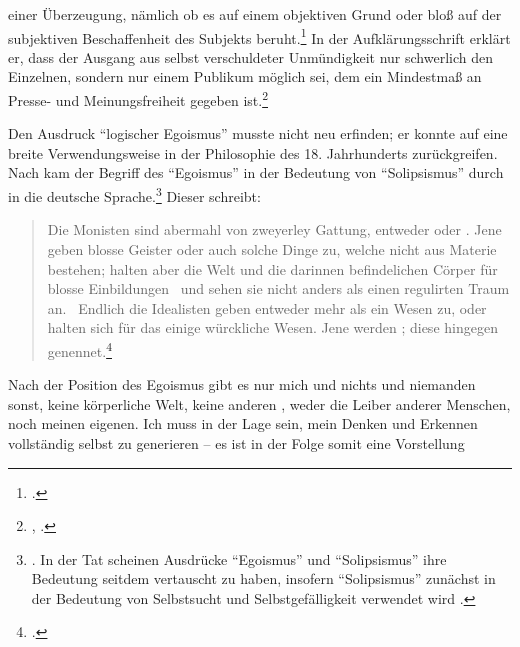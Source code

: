 einer Überzeugung, nämlich ob es auf einem objektiven Grund oder bloß auf der
subjektiven Beschaffenheit des Subjekts
beruht.\footnote{\cite[Vgl.][B 848\,f.,]{Kant:KritikderreinenVernunft2003}
\cite[][III: 532.3--16]{Kant:GesammelteWerke1900ff.}.} In der Aufklärungsschrift
erklärt er, dass der Ausgang aus selbst verschuldeter Unmündigkeit nur schwerlich den
Einzelnen, sondern nur einem Publikum möglich sei, dem ein Mindestmaß an Presse-
und Meinungsfreiheit gegeben
ist.\footnote{\cite[Vgl.][A~482--484]{Kant:BeantwortungderFrage:WasistAufklaerung?1977},
\cite[][VIII: 36.4--37]{Kant:GesammelteWerke1900ff.}.}


Den Ausdruck \enquote{logischer Egoismus} musste  nicht neu
erfinden; er konnte auf eine breite Verwendungsweise in der Philosophie des 18.
Jahrhunderts zurückgreifen. Nach
 kam der
Begriff des \enquote{Egoismus} in der Bedeutung von \enquote{Solipsismus} durch
 in die
deutsche
Sprache.\footnote{\cite[Vgl.][39]{Hinske:PluralismusundPublikationsfreiheitimDenkenKants1986}.
In der Tat scheinen Ausdrücke \enquote{Egoismus} und \enquote{Solipsismus} ihre
Bedeutung seitdem vertauscht zu haben, insofern \enquote{Solipsismus} zunächst
in der Bedeutung von Selbstsucht und Selbstgefälligkeit verwendet wird
\parencite[vgl.][224--227]{Halbfass:DescartesFragenachderExistenzderWelt1968}.}
Dieser schreibt:
\begin{quote}
 Die Monisten sind abermahl von zweyerley Gattung, entweder 
 oder . Jene geben blosse Geister oder auch solche Dinge zu,
 welche nicht aus Materie bestehen\punkt ; halten aber die Welt und die darinnen
 befindelichen Cörper für blosse Einbildungen \punkt\ und sehen sie nicht anders
 als einen regulirten Traum an. \punkt\ Endlich die Idealisten geben entweder
 mehr als ein Wesen zu, oder halten sich für das einige würckliche Wesen. Jene
 werden ; diese hingegen 
 genennet.\footnote{\cite[][Vorrede zu der andern Auflage (nicht
 paginiert)]{Wolff:VernuenftigeGedankenvondenKraeftendesmenschlichenVerstandesundihremrichtigenGebraucheinErkenntnisderWahrheit1978}.}
\end{quote}
Nach der Position des Egoismus gibt es nur mich und nichts und niemanden sonst,
keine körperliche Welt, keine anderen , weder die Leiber anderer Menschen, noch meinen
eigenen. Ich muss in der Lage sein, mein Denken und Erkennen
vollständig selbst zu generieren -- es ist in der Folge somit eine Vorstellung
